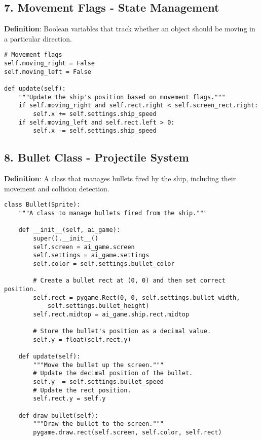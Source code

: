 \subsection*{7. Movement Flags - State Management}
\textbf{Definition}: Boolean variables that track whether an object should be moving in a particular direction.

\begin{lstlisting}
# Movement flags
self.moving_right = False
self.moving_left = False

def update(self):
    """Update the ship's position based on movement flags."""
    if self.moving_right and self.rect.right < self.screen_rect.right:
        self.x += self.settings.ship_speed
    if self.moving_left and self.rect.left > 0:
        self.x -= self.settings.ship_speed
\end{lstlisting}

\subsection*{8. Bullet Class - Projectile System}
\textbf{Definition}: A class that manages bullets fired by the ship, including their movement and collision detection.

\begin{lstlisting}
class Bullet(Sprite):
    """A class to manage bullets fired from the ship."""
    
    def __init__(self, ai_game):
        super().__init__()
        self.screen = ai_game.screen
        self.settings = ai_game.settings
        self.color = self.settings.bullet_color
        
        # Create a bullet rect at (0, 0) and then set correct position.
        self.rect = pygame.Rect(0, 0, self.settings.bullet_width,
            self.settings.bullet_height)
        self.rect.midtop = ai_game.ship.rect.midtop
        
        # Store the bullet's position as a decimal value.
        self.y = float(self.rect.y)
    
    def update(self):
        """Move the bullet up the screen."""
        # Update the decimal position of the bullet.
        self.y -= self.settings.bullet_speed
        # Update the rect position.
        self.rect.y = self.y
    
    def draw_bullet(self):
        """Draw the bullet to the screen."""
        pygame.draw.rect(self.screen, self.color, self.rect)
\end{lstlisting}

